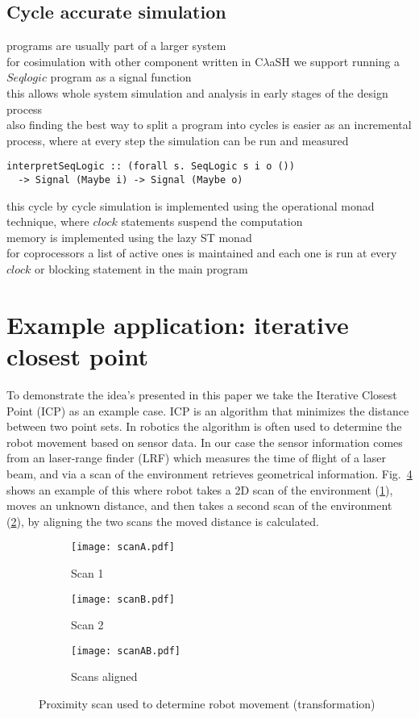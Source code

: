 \documentclass[preprint]{sigplanconf}
\def\clash{C$\lambda$aSH\xspace}
\begin{document}
\subsection{Cycle accurate simulation}
programs are usually part of a larger system \\
for cosimulation with other component written in \clash we support running a $Seqlogic$ program as a signal function \\
this allows whole system simulation and analysis in early stages of the design process \\
also finding the best way to split a program into cycles is easier as an incremental process, where at every step the simulation can be run and measured
\begin{lstlisting}
interpretSeqLogic :: (forall s. SeqLogic s i o ())
  -> Signal (Maybe i) -> Signal (Maybe o)
\end{lstlisting}
this cycle by cycle simulation is implemented using the operational monad technique, where $clock$ statements suspend the computation \\
memory is implemented using the lazy ST monad \\
for coprocessors a list of active ones is maintained and each one is run at every $clock$ or blocking statement in the main program


\section{Example application: iterative closest point}
To demonstrate the idea's presented in this paper we take the Iterative Closest Point (ICP) as an example case.
ICP\cite{ICP} is an algorithm that minimizes the distance between two point sets. In robotics the algorithm is often used to determine the robot movement based on sensor data.
In our case the sensor information comes from an laser-range finder (LRF) which measures the time of flight of a laser beam, and via a scan of the environment retrieves geometrical information.
Fig.~\ref{fig:icp_scans} shows an example of this where robot takes a 2D scan of the environment (\ref{fig:icp_scanA}), moves an unknown distance, and then takes a second scan of the environment (\ref{fig:icp_scanB}), by aligning the two scans the moved distance is calculated. 

\begin{figure}[ht]
	\centering
	\begin{subfigure}{0.13\textwidth}
		\centering
		\texttt{[image: scanA.pdf]}
		\caption{Scan 1}
		\label{fig:icp_scanA}
	\end{subfigure}
	\begin{subfigure}{0.12\textwidth}
		\centering
		\texttt{[image: scanB.pdf]}
		\caption{Scan 2}
		\label{fig:icp_scanB}
	\end{subfigure}
	\begin{subfigure}{0.20\textwidth}
		\centering
		\texttt{[image: scanAB.pdf]}
		\caption{Scans aligned}
		\label{fig:icp_scanAB}
	\end{subfigure}
	\caption{Proximity scan used to determine robot movement (transformation)}
	\label{fig:icp_scans}
\end{figure}
\end{document}
